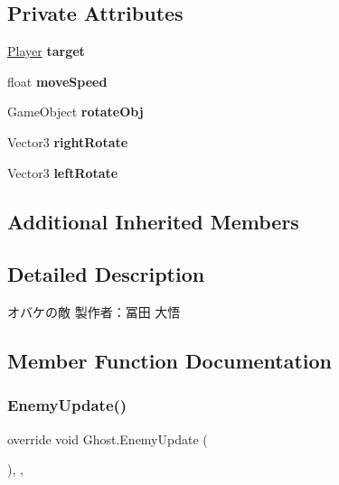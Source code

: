 \subsection*{Private Attributes}
\begin{DoxyCompactItemize}
\item 
\mbox{\label{class_ghost_a57506933b5e6e70913ca2b60a9865a1b}} 
\hyperlink{class_player}{Player} {\bfseries target}
\item 
\mbox{\label{class_ghost_ae85a44dc1f2b979a70f8ee672172fae7}} 
float {\bfseries move\+Speed}
\item 
\mbox{\label{class_ghost_a8be551b6c8ae6b1bb4c6e96b55d38f04}} 
Game\+Object {\bfseries rotate\+Obj}
\item 
\mbox{\label{class_ghost_a00bf7d4da2188d74687ed1f79544fd02}} 
Vector3 {\bfseries right\+Rotate}
\item 
\mbox{\label{class_ghost_a3a91dcdd10f9770f3b00f27de6c40904}} 
Vector3 {\bfseries left\+Rotate}
\end{DoxyCompactItemize}
\subsection*{Additional Inherited Members}


\subsection{Detailed Description}
オバケの敵 製作者：冨田 大悟 



\subsection{Member Function Documentation}
\mbox{\label{class_ghost_a26c210f4d5bfbecc82cd577fafb0cfdb}} 
\subsubsection{\texorpdfstring{Enemy\+Update()}{EnemyUpdate()}}
{\footnotesize\ttfamily override void Ghost.\+Enemy\+Update (\begin{DoxyParamCaption}{ }\end{DoxyParamCaption})\hspace{0.3cm}{\ttfamily [inline]}, {\ttfamily [protected]}, {\ttfamily [virtual]}}



